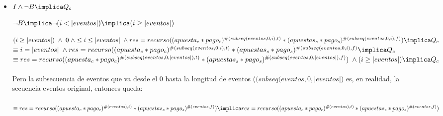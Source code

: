 \documentclass[10pt,a4paper]{article}
\begin{document}
\begin{itemize}[leftmargin=*]
Notamos que para que esto pase, pedimos que $eventos_{[i]} \phantom{.} = true. \phantom{.} Luego \phantom{.} \#(subseq(eventos,0,i+1),t) \equiv \phantom{.} \\ \#(subseq(eventos,0,i),t) + 1 \phantom{.} y \phantom{.} \#(subseq(eventos,0,i+1),f) \equiv \phantom{.} \#(subseq(eventos,0,i),f) + 0.\\
Finalmente \phantom{.} si \phantom{.} (apuestas_{c}*pago_{c}) \phantom{.} pasa \phantom{.} dividiendo(mismo \phantom{.} que \phantom{.} restar \phantom{.} uno \phantom{.} en \phantom{.} el \phantom{.} exponente): \phantom{.}  res = \phantom{.} recursos *((apuestas_{c}*pago_{c})^{\#(subseq(eventos,o,i),t) +1 -1} *(apuestas_{s}*pago_{s})^{\#(subseq(eventos,o,i),F)})  
$\\
Finalmete $\phantom{.} WP(S3,I) \equiv \phantom{.} (0 \leq i+1 \leq |eventos| \phantom{.} \wedge \phantom{.} eventos_{[i]} \phantom{.} = \phantom{.} True \phantom{.} \wedge \phantom{.} res = \phantom{.} recursos *((apuestas_{c}*pago_{c})^{\#(subseq(eventos,o,i),t)} *(apuestas_{s}*pago_{s})^{\#(subseq(eventos,o,i),F)}))$ y por lo antes explicado y dado que llegamos a implicar el invariante demostramos la correctitud de este paso.

\vspace{0.3cm} \\


    \item [3] $I \wedge \neg B \implica Q_c$\vspace{0.3cm}

$\neg B \implica \neg (i < |eventos|) \implica (i \geq |eventos|)$ 

$(i \geq |eventos|) \phantom{.} \wedge \phantom{.} 0 \phantom{.} \wedge \leq i \leq |eventos| \phantom{.} \wedge \\ res = recurso((apuesta_c * pago_c)^{\#(subseq(eventos,0,i), t)} * (apuestas_s * pago_s)^{\#(subseq(eventos,0,i), f)}) \implica Q_c$
\vspace{0.3cm}\\
$\equiv i = |eventos| \phantom{.} \wedge \\ res = recurso((apuesta_c * pago_c)^{\#(subseq(eventos,0,i), t)} * (apuestas_s * pago_s)^{\#(subseq(eventos,0,i), f)} \implica Q_c$
\vspace{0.3cm}\\
$\equiv res = recurso((apuesta_c * pago_c)^{\#(subseq(eventos,0,|eventos|), t)} * (apuestas_s * pago_s)^{\#(subseq(eventos,0,|eventos|), f)}) \phantom{.} \wedge \\ (i \geq |eventos|) \implica Q_c$\\
\\Pero la subsecuencia de eventos que va desde el 0 hasta la longitud de eventos ($(subseq(eventos,0,|eventos|$) es, en realidad, la secuencia eventos original, entonces queda:\\
\\
$\equiv res = recurso((apuesta_c * pago_c)^{\#(eventos), t)} * (apuestas_s * pago_s)^{\#(eventos, f)})\\ \implica res = recurso((apuesta_c * pago_c)^{\#(eventos), t)} * (apuestas_s * pago_s)^{\#(eventos, f)})$


\end{itemize}
\end{document}
